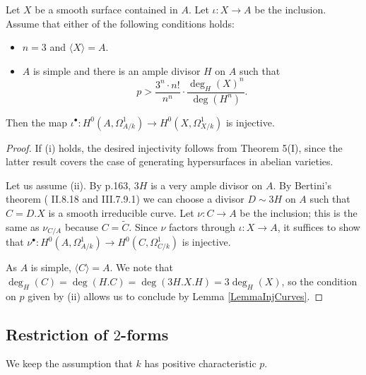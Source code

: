 \begin{lemma}
\notready\label{LemmaInjSurfaces} Let $X$ be a smooth surface contained in $A$. Let $\iota:X\to A$ be the inclusion. Assume that either of the following conditions holds:
\begin{itemize}
\item[(i)] $n=3$ and $\langle X \rangle =A$.
\item[(ii)] $A$ is simple and there is an ample divisor $H$ on $A$ such that
$$
p>\frac{3^n\cdot n!}{n^n}\cdot \frac{\deg_H(X)^n}{\deg(H^n)}.
$$
\end{itemize}
Then the map  $\iota^\bullet : H^0(A,\Omega^1_{A/k})\to H^0(X,\Omega^1_{X/k})$ is injective.
\end{lemma}
\begin{proof} If (i) holds, the desired injectivity follows from \cite{NakaiOThDifAlgVar} Theorem 5(I), since the latter result covers the case of generating hypersurfaces in abelian varieties.

Let us assume (ii). By \cite{Mumford} p.163, $3H$ is a very ample divisor on $A$.  By Bertini's theorem (\cite{Hartshorne} II.8.18 and III.7.9.1) we can choose a divisor $D\sim 3H$ on $A$ such that $C=D.X$ is a smooth irreducible curve. Let $\nu : C\to A$ be the inclusion; this is the same as $\nu_{C/A}$ because $C=\widetilde{C}$. Since $\nu$ factors through $\iota:X\to A$, it suffices to show that $\nu^\bullet : H^0(A,\Omega^1_{A/k})\to H^0(C,\Omega^1_{C/k})$ is injective.

As $A$ is simple, $\langle C\rangle =A$. We note that $\deg_H(C) =\deg(H.C)= \deg(3H.X.H)=3\deg_H(X)$, so the condition on $p$ given by (ii) allows us to conclude by Lemma \ref{LemmaInjCurves}.
\end{proof}


\subsection{Restriction of $2$-forms} We keep the assumption that $k$ has positive characteristic $p$.

